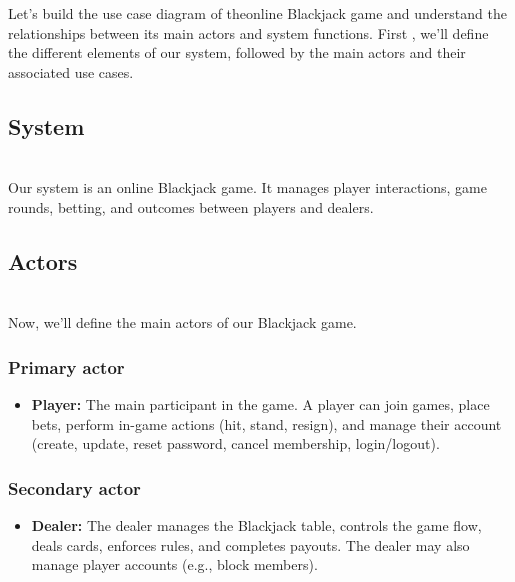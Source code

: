 

Let's build the use case diagram of theonline Blackjack game and understand the relationships between its main actors and system functions. First , we'll define the different elements of our system, followed by the main actors and their associated use cases.

\subsection{System}\label{cP3DA2FVfsFuTwFqqixwy}
\\
Our system is an online Blackjack game. It manages player interactions, game rounds, betting, and outcomes between players and dealers.

\subsection{Actors}\label{kxFtRFH2EYDl4tVZpjsls}
\\
Now, we'll define the main actors of our Blackjack game.

\subsubsection{Primary actor}\label{IPDUHtML9sqQwKmSe8JY2}

\begin{itemize}
\item
\protect{}\label{-VknleK5wdxWZumDCJo0T}
\textbf{Player:} The main participant in the game. A player can join games, place bets, perform in-game actions (hit, stand, resign), and manage their account (create, update, reset password, cancel membership, login/logout).
\end{itemize}

\subsubsection{Secondary actor}\label{GWhiEOEVSdDmBizndxOiY}

\begin{itemize}
\item
\protect{}\label{NRPbwJraOhjj7b9ec5UQs}
\textbf{Dealer:} The dealer manages the Blackjack table, controls the game flow, deals cards, enforces rules, and completes payouts. The dealer may also manage player accounts (e.g., block members).
\end{itemize}

